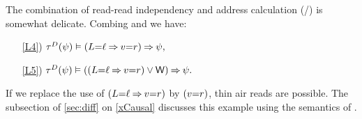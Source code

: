 \begin{example}
  \label{ex:xADDRxRRD}
  The combination of read-read independency and address calculation
  (\xADDR/\xRRD) is somewhat delicate.  Combing  and
   we have:
  \begin{enumerate}
    
  \item[\ref{L4})]
    \begin{math}
      \aTr{\bEvs}{\bForm} \rimplies
      (\cExp{=}\cVal\limplies\aVal{=}\aReg)\limplies\bForm,
    \end{math}
  \item[\ref{L5})]
    \begin{math}
      \aTr{\cEvs}{\bForm} \rimplies
      ((\cExp{=}\cVal\limplies\aVal{=}\aReg)\lor\RW)\limplies\bForm.
    \end{math}
  \end{enumerate}
  If we replace the use of $(L{=}\ell\mathbin{\Rightarrow}v{=}r)$ by
  $(v{=}r)$, thin air reads are possible.  The subsection of
  \textsection\ref{sec:diff} on \ref{xCausal} discusses this example using
  the semantics of \jjr{}.
  

\end{example}
